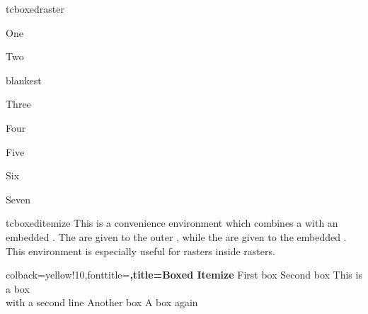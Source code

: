 \begin{docEnvironment}[doc new=2016-02-19]{tcboxedraster}{}
\begin{dispExample}
\begin{tcbraster}[raster columns=2, raster equal height,
  raster every box/.style={size=small,colframe=red!50!black,colback=red!10!white,
    valign=center,halign=center}]
  \begin{tcolorbox}One\end{tcolorbox}
  \begin{tcolorbox}Two\end{tcolorbox}
    \begin{tcboxedraster}{blankest}
      \begin{tcolorbox}Three\end{tcolorbox}
      \begin{tcolorbox}Four\end{tcolorbox}
      \begin{tcolorbox}Five\end{tcolorbox}
      \begin{tcolorbox}Six\end{tcolorbox}
    \end{tcboxedraster}
    \begin{tcolorbox}Seven\end{tcolorbox}
\end{tcbraster}
\end{dispExample}
\end{docEnvironment}


\clearpage
\begin{docEnvironment}[doc new=2016-04-27]{tcboxeditemize}{}
  This is a convenience environment which combines a  with
  an embedded . The  are given to the
  outer , while the  are given to the
  embedded .
  This environment is especially useful for rasters inside rasters.

\begin{dispExample}
\begin{tcboxeditemize}[raster columns=3, raster equal height,
  size=small,colframe=red!50!black,colback=red!10!white,colbacktitle=red!50!white,
  title={Box \# \thetcbrasternum}]
  {colback=yellow!10,fonttitle=\bfseries,title=Boxed Itemize}
  \tcbitem First box
  \tcbitem Second box
  \tcbitem This is a box\\with a second line
  \tcbitem Another box
  \tcbitem A box again
\end{tcboxeditemize}
\end{dispExample}
\end{docEnvironment}


